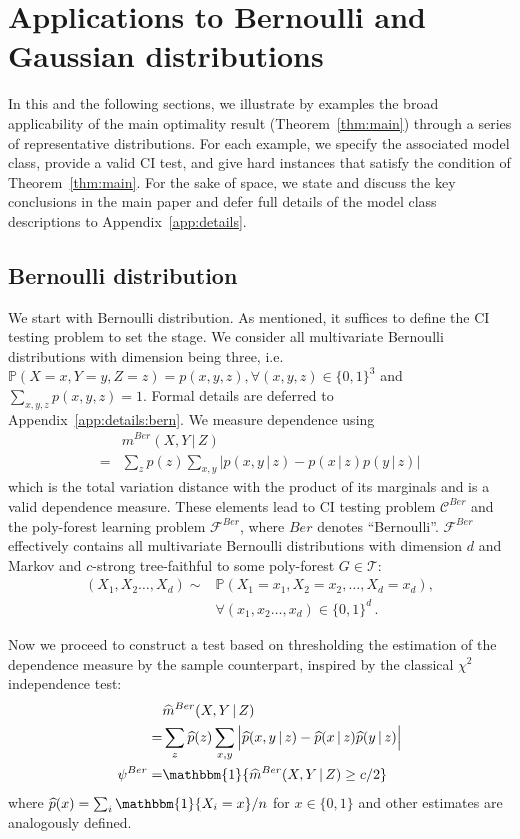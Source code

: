 \documentclass{article}
\theoremstyle{definition}
\theoremstyle{definition}
\theoremstyle{definition}
\theoremstyle{definition}
\theoremstyle{definition}
\theoremstyle{definition}
\theoremstyle{remark}
\theoremstyle{remark}
\newcommand{\prob}{\mathbb{P}}
\newcommand{\given}{\,|\,}
\newcommand{\pltr}{\mathcal{T}}
\newcommand{\dpdm}{m}
\newcommand{\dd}{d}
\newcommand{\ciclass}{\mathcal{C}}
\newcommand{\pfclass}{\mathcal{F}}
\begin{document}
\section{Applications to Bernoulli and Gaussian distributions}\label{sec:param}
In this and the following sections, we illustrate by examples  the broad applicability of the main optimality result (Theorem~\ref{thm:main}) through a series of representative distributions.
For each example, we specify the associated model class, provide a valid CI test, and give hard instances that satisfy the condition of Theorem~\ref{thm:main}.
For the sake of space, we state and discuss the key conclusions in the main paper and defer full details of the model class descriptions to Appendix~\ref{app:details}.


\subsection{Bernoulli distribution}\label{sec:param:bern}
We start with Bernoulli distribution. 
As mentioned, it suffices to define the CI testing problem to set the stage. 
We consider all multivariate Bernoulli distributions with dimension being three, i.e. $\prob(X=x, Y=y, Z=z)= p(x,y,z),  \forall (x,y,z)\in\{0,1\}^3$ and  $\sum_{x,y,z}p(x,y,z)=1$.
Formal details are deferred to Appendix~\ref{app:details:bern}.
We measure dependence using 
\begin{align*}
    & \dpdm^{Ber}(X,Y\given Z) \\
    =&  \sum_z p(z)\sum_{x,y}\Big|p(x,y\given z) -p(x\given z)p(y\given z)\Big|
\end{align*}
which is the total variation distance with the product of its marginals and is a valid dependence measure.
These elements lead to CI testing problem $\ciclass^{Ber}$ and the poly-forest learning problem $\pfclass^{Ber}$, where $Ber$ denotes ``Bernoulli''. 
$\pfclass^{Ber}$ effectively contains all multivariate Bernoulli distributions with dimension $\dd$ and Markov and $c$-strong tree-faithful to some poly-forest $G\in \pltr$:
\begin{align*}
     (X_1,X_2\ldots,X_\dd) \sim & \prob(X_1=x_1, X_2=x_2,\ldots, X_\dd=x_\dd), \\
    &\forall (x_1,x_2\ldots,x_\dd)\in\{0,1\}^\dd\,.
\end{align*}

Now we proceed to construct a test based on thresholding the estimation of the dependence measure by the sample counterpart, inspired by the classical $\chi^2$ independence test:
\begin{align}\label{eq:bern:test}
    &\widehat{\dpdm}^{Ber}(X,Y\given Z) \\\nonumber
    =&  \sum_z \widehat{p}(z)\sum_{x,y}\Big|\widehat{p}(x,y\given z) - \widehat{p}(x\given z)\widehat{p}(y\given z)\Big|\\
    \psi^{Ber} =& \mathbbm{1}\{\widehat{\dpdm}^{Ber}(X,Y\given Z) \ge c/2\} 
\end{align}
where $\widehat{p}(x) = \sum_i \mathbbm{1}\{X_i=x\} / n$ for $x\in\{0,1\}$ and other estimates are analogously defined. 
\end{document}
